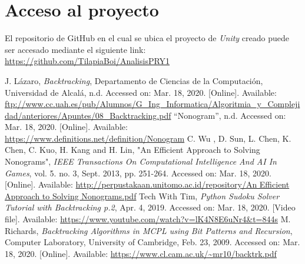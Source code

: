 \documentclass[conference]{IEEEtran}
\begin{document}
\section{Acceso al proyecto}
El repositorio de GitHub en el cual se ubica el proyecto de \textit{Unity} creado puede ser accesado mediante el siguiente link: \url{https://github.com/TilapiaBoi/AnalisisPRY1}

\begin{thebibliography}{00}
 J. L\'azaro, \textit{Backtracking}, Departamento de Ciencias de la Computaci\'on, Universidad de Alcal\'a, n.d. Accessed on: Mar. 18, 2020. [Online]. Available: \url{ftp://www.cc.uah.es/pub/Alumnos/G_Ing_Informatica/Algoritmia_y_Complejidad/anteriores/Apuntes/08_Backtracking.pdf}
 “Nonogram”, n.d. Accessed on: Mar. 18, 2020. [Online]. Available: \url{https://www.definitions.net/definition/Nonogram}
  C. Wu , D. Sun, L. Chen, K. Chen, C. Kuo, H. Kang and H. Lin, "An Efficient Approach to Solving Nonograms", \textit{IEEE Transactions On Computational Intelligence And AI In Games}, vol. 5. no. 3, Sept. 2013,  pp. 251-264. Accessed on: Mar. 18, 2020. [Online]. Available: \url{http://perpustakaan.unitomo.ac.id/repository/An Efficient Approach to Solving Nonograms.pdf}
 Tech With Tim, \textit{Python Sudoku Solver Tutorial with Backtracking p.2}, Apr. 4, 2019. Accessed on: Mar. 18, 2020. [Video file]. Available: \url{https://www.youtube.com/watch?v=lK4N8E6uNr4&t=844s}
 M. Richards, \textit{Backtracking Algorithms in MCPL using Bit Patterns and Recursion}, Computer Laboratory, University of Cambridge, Feb. 23, 2009. Accessed on: Mar. 18, 2020. [Online]. Available: \url{https://www.cl.cam.ac.uk/~mr10/backtrk.pdf}
\end{thebibliography}
\end{document}
